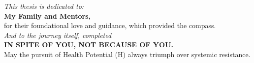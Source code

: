 
\vspace*{\fill}
\begin{center}
    \textit{This thesis is dedicated to:}\\
    \vspace{1cm}
    \textbf{My Family and Mentors,} \\
    for their foundational love and guidance, which provided the compass.\\
    \vspace{1.0cm}
    \textit{And to the journey itself, completed}\\
    \vspace{0.8cm}
    \textbf{IN SPITE OF YOU, NOT BECAUSE OF YOU.}
    \vspace{0.8cm}
    \\
    May the pursuit of Health Potential (H) always triumph over systemic resistance.
\end{center}
\vspace*{\fill}
\clearpage